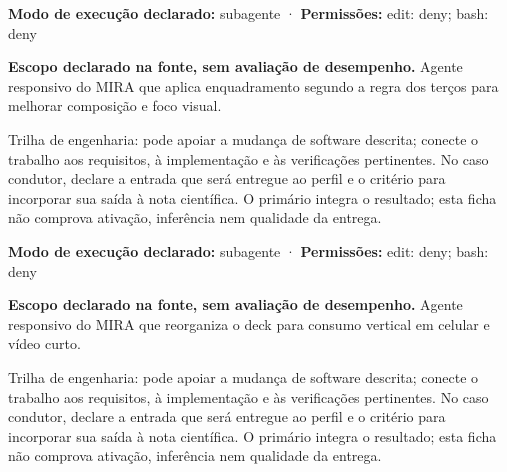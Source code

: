 \begin{arquitetura}
\textbf{Modo de execução declarado:} subagente · \textbf{Permissões:} edit: deny; bash: deny
\end{arquitetura}


\begin{descricao}
\textbf{Escopo declarado na fonte, sem avaliação de desempenho.}
Agente responsivo do MIRA que aplica enquadramento segundo a regra dos terços para melhorar composição e foco visual.
\end{descricao}

\begin{funcao}
Trilha de engenharia: pode apoiar a mudança de software descrita; conecte o trabalho aos requisitos, à implementação e às verificações pertinentes. No caso condutor, declare a entrada que será entregue ao perfil e o critério para incorporar sua saída à nota científica. O primário integra o resultado; esta ficha não comprova ativação, inferência nem qualidade da entrega.
\end{funcao}

\begin{arquitetura}
\textbf{Modo de execução declarado:} subagente · \textbf{Permissões:} edit: deny; bash: deny
\end{arquitetura}


\begin{descricao}
\textbf{Escopo declarado na fonte, sem avaliação de desempenho.}
Agente responsivo do MIRA que reorganiza o deck para consumo vertical em celular e vídeo curto.
\end{descricao}

\begin{funcao}
Trilha de engenharia: pode apoiar a mudança de software descrita; conecte o trabalho aos requisitos, à implementação e às verificações pertinentes. No caso condutor, declare a entrada que será entregue ao perfil e o critério para incorporar sua saída à nota científica. O primário integra o resultado; esta ficha não comprova ativação, inferência nem qualidade da entrega.
\end{funcao}


